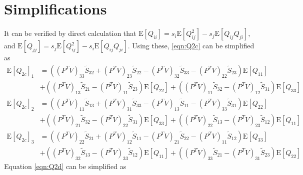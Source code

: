 \documentclass[10pt]{article}
\newcommand{\expect}[1]{\ensuremath{\mathrm{E}\left[ #1 \right]}}
\begin{document}
\section{Simplifications}
It can be verified by direct calculation that $\expect{Q_{ii}} = s_i\expect{Q_{ij}^2}-s_j\expect{Q_{ij}Q_{ji}}$, and $\expect{Q_{jj}} = s_j\expect{Q_{ij}^2}-s_i\expect{Q_{ij}Q_{ji}}$.
Using these, \eqref{eqn:Q2c} can be simplified as
\begin{align}
	\expect{Q_{2c}}_1 &= \left( (P^TV)_{33}\tilde{S}_{32} + (P^TV)_{23}\tilde{S}_{22} - (P^TV)_{32}\tilde{S}_{33} - (P^TV)_{22}\tilde{S}_{23} \right)\expect{Q_{11}} \nonumber \\
	&+ \left( (P^TV)_{13}\tilde{S}_{21} - (P^TV)_{11}\tilde{S}_{23} \right)\expect{Q_{22}} + \left( (P^TV)_{11}\tilde{S}_{32} - (P^TV)_{12}\tilde{S}_{31} \right)\expect{Q_{33}} \nonumber \\
	\expect{Q_{2c}}_2 &= \left( (P^TV)_{11}\tilde{S}_{13} + (P^TV)_{31}\tilde{S}_{33} - (P^TV)_{13}\tilde{S}_{11} - (P^TV)_{33}\tilde{S}_{31} \right)\expect{Q_{22}} \nonumber \\
	&+ \left( (P^TV)_{21}\tilde{S}_{32} - (P^TV)_{22}\tilde{S}_{31} \right)\expect{Q_{33}} + \left( (P^TV)_{22}\tilde{S}_{13} - (P^TV)_{23}\tilde{S}_{12} \right)\expect{Q_{11}} \nonumber \\
	\expect{Q_{2c}}_3 &= \left( (P^TV)_{22}\tilde{S}_{21} + (P^TV)_{12}\tilde{S}_{11} - (P^TV)_{21}\tilde{S}_{22} - (P^TV)_{11}\tilde{S}_{12} \right)\expect{Q_{33}} \nonumber \\
	&+ \left( (P^TV)_{32}\tilde{S}_{13} - (P^TV)_{33}\tilde{S}_{12} \right)\expect{Q_{11}} + \left( (P^TV)_{33}\tilde{S}_{21} - (P^TV)_{31}\tilde{S}_{23} \right)\expect{Q_{22}}
\end{align}
Equation \eqref{eqn:Q2d} can be simplified as
\end{document}

